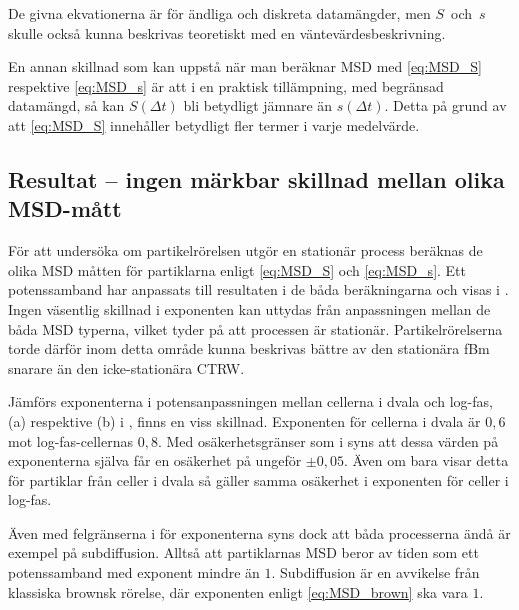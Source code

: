 De givna ekvationerna är för ändliga och diskreta datamängder, men $S$~och~$s$ skulle också kunna beskrivas teoretiskt med en väntevärdesbeskrivning.

En annan skillnad som kan uppstå när man beräknar MSD med \eqref{eq:MSD_S} respektive \eqref{eq:MSD_s} är att i en praktisk tillämpning, med begränsad datamängd, så kan $S(\Delta{t})$ bli betydligt jämnare än $s(\Delta{t})$. Detta på grund av att \eqref{eq:MSD_S} innehåller betydligt fler termer i varje medelvärde. 


\subsection{Resultat -- ingen märkbar skillnad mellan olika MSD-mått}






För att undersöka om partikelrörelsen utgör en stationär process beräknas de olika MSD måtten för partiklarna enligt \eqref{eq:MSD_S} och \eqref{eq:MSD_s}. Ett potenssamband har anpassats till resultaten i de båda beräkningarna och visas i . 
Ingen väsentlig skillnad i exponenten kan uttydas från anpassningen mellan de båda MSD typerna, vilket tyder på att processen är stationär. Partikelrörelserna torde därför inom detta område kunna beskrivas bättre av den stationära fBm snarare än den icke-stationära CTRW.

Jämförs exponenterna i potensanpassningen mellan cellerna i dvala och log-fas, (a) respektive (b) i , finns en viss skillnad. Exponenten för cellerna i dvala är $0,6$ mot log-fas-cellernas $0,8$. Med osäkerhetsgränser som i  syns att dessa värden på exponenterna själva får en osäkerhet på ungeför $\pm 0,05$. Även om  bara visar detta för partiklar från celler i dvala så gäller samma osäkerhet i exponenten för celler i log-fas.

Även med felgränserna i  för exponenterna syns dock att båda processerna ändå är exempel på subdiffusion. Alltså att partiklarnas MSD beror av tiden som ett potenssamband med exponent mindre än $1$. Subdiffusion är en avvikelse från klassiska brownsk rörelse, där exponenten enligt \eqref{eq:MSD_brown} ska vara $1$. 



